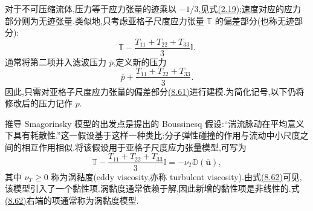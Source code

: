 \begin{note}[偏差部分的建模]
\label{note:sgs-deviatoric-part}
对于不可压缩流体,压力等于应力张量的迹乘以 $-1/3$,见式\hyperref[eq:pressure-from-stress-trace]{(2.19)};速度对应的应力部分则为无迹张量.类似地,只考虑亚格子尺度应力张量 $\mathbb{T}$ 的偏差部分(也称无迹部分):
\begin{equation}\label{eq:sgs-deviatoric-part}
 \mathbb{T}
  -\frac{T_{11}+T_{22}+T_{33}}{3}\mathbb{I}.
\end{equation}
通常将第二项并入滤波压力 $\overline{p}$,定义新的压力
\[
 \overline{p}
  +\frac{T_{11}+T_{22}+T_{33}}{3}.
\]
因此,只需对亚格子尺度应力张量的偏差部分\hyperref[eq:sgs-deviatoric-part]{(8.61)}进行建模.为简化记号,以下仍将修改后的压力记作 $p$.
\end{note}

\begin{note}[Boussinesq 假设]
\label{note:boussinesq-hypothesis}
推导 Smagorinsky 模型的出发点是\textcite{Boussinesq1877}提出的 Boussinesq 假设:“湍流脉动在平均意义下具有耗散性.”这一假设基于这样一种类比:分子弹性碰撞的作用与流动中小尺度之间的相互作用相似.将该假设用于亚格子尺度应力张量模型,可写为
\begin{equation}\label{eq:boussinesq-hypothesis}
 \mathbb{T}
  -\frac{T_{11}+T_{22}+T_{33}}{3}\mathbb{I}
  =-\nu_T\mathbb{D}(\overline{\bm{u}}),
\end{equation}
其中 $\nu_T\ge0$ 称为涡黏度(eddy viscosity,亦称 turbulent viscosity).由式\hyperref[eq:boussinesq-hypothesis]{(8.62)}可见,该模型引入了一个黏性项.涡黏度通常依赖于解,因此新增的黏性项是非线性的.式\hyperref[eq:boussinesq-hypothesis]{(8.62)}右端的项通常称为涡黏度模型.
\end{note}

